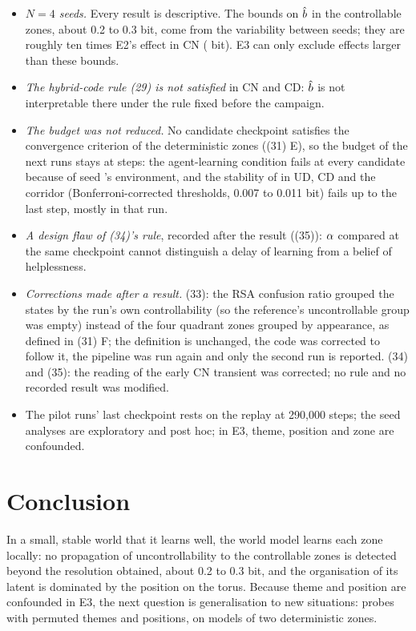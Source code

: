\documentclass[10pt]{article}
\begin{document}
\begin{itemize}
  \item \emph{$N = 4$ seeds.} Every result is descriptive. The bounds on $\hat{b}$ in the controllable zones, about 0.2 to %
    0.3 bit, come from the variability between seeds; they are roughly ten times E2's effect in CN %
    (\eTwoEffectCN{} bit). E3 can only exclude effects larger than these bounds.
  \item \emph{The hybrid-code rule (29) is not satisfied} in CN and CD: $\hat{b}$ is not interpretable there under the %
    rule fixed before the campaign.
  \item \emph{The budget was not reduced.} No candidate checkpoint satisfies the convergence criterion of the
    deterministic zones ((31) E), so the budget of the next runs stays at \eThreeBudget{} steps: the agent-learning %
    condition fails at every candidate because of seed \eThreeCampaignSeedA's environment, and the stability of \Is{} in
    UD, CD and the corridor (Bonferroni-corrected thresholds, 0.007 to 0.011 bit) fails up to the last step, mostly in %
    that run.
  \item \emph{A design flaw of (34)'s rule}, recorded after the result ((35)): $\alpha$ compared at the same %
    checkpoint cannot distinguish a delay of learning from a belief of helplessness.
  \item \emph{Corrections made after a result.} (33): the RSA confusion ratio grouped the states by the run's own %
    controllability (so the reference's uncontrollable group was empty) instead of the four quadrant zones grouped by
    appearance, as defined in (31) F; the definition is unchanged, the code was corrected to follow it, the pipeline %
    was run again and only the second run is reported. (34) and (35): the reading of the early CN transient was %
    corrected; no rule and no recorded result was modified.
  \item The pilot runs' last checkpoint rests on the replay at 290,000 steps; the seed \eThreeCampaignSeedA{} analyses %
    are exploratory and post hoc; in E3, theme, position and zone are confounded.
\end{itemize}

\section{Conclusion}
\label{sec:conclusion}

In a small, stable world that it learns well, the world model learns each zone locally: no propagation of
uncontrollability to the controllable zones is detected beyond the resolution obtained, about 0.2 to 0.3 bit, and the %
organisation of its latent is dominated by the position on the torus. Because theme and position are confounded in E3,
the next question is generalisation to new situations: probes with permuted themes and positions, on models of two
deterministic zones.



\end{document}
